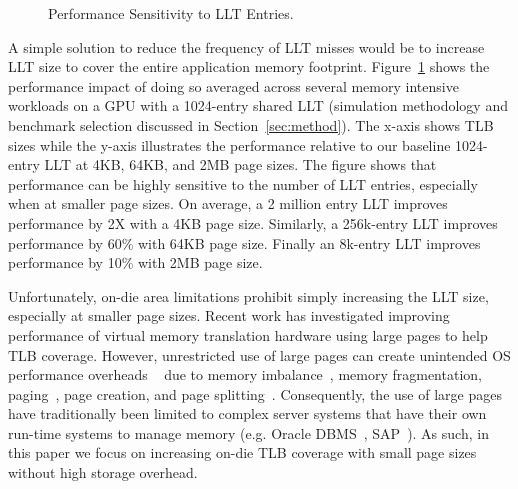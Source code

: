 \begin{figure}[t] 
\vspace{0. in}
\centering
\centerline{}

	\caption{\small Performance Sensitivity to LLT Entries. \normalsize}

\label{fig:tlb_sensitivity} 
\vspace{-0.15 in}
\end{figure}

A simple
solution to reduce the frequency of LLT misses would be to increase LLT size
to cover the entire application memory footprint. 
Figure~\ref{fig:tlb_sensitivity} shows the performance impact of doing so
averaged across several memory intensive workloads on a GPU with a 1024-entry
shared LLT (simulation methodology and benchmark selection discussed in 
Section~\ref{sec:method}). The
x-axis shows TLB sizes while the y-axis
illustrates the performance relative to our baseline 1024-entry LLT
at 4KB, 64KB, and 2MB page sizes. 
The figure shows that performance can be highly sensitive to the number of LLT entries, especially when
at smaller page sizes. On average, a 2 million entry LLT improves
performance by 2X with a 4KB page size. Similarly, a 256k-entry
LLT improves performance by 60\% with 64KB page size. Finally an 8k-entry LLT improves performance by 10\% with 2MB page size.

Unfortunately,
on-die area limitations prohibit simply increasing the LLT size, especially
at smaller page sizes. 
Recent work has investigated improving performance of virtual memory
translation hardware using large pages to help TLB coverage. 
However, unrestricted use of large pages can create unintended
OS performance overheads ~\cite{SuperPageProblem, TwoPageSize} due to
memory imbalance~\cite{numa-harmful}, memory fragmentation,
paging~\cite{cameo}, page creation, and page
splitting~\cite{largepagevm}. Consequently, the use of large pages
have traditionally been limited to complex server systems that have
their own run-time systems to manage memory (e.g. Oracle
DBMS~\cite{oracle_dbms}, SAP~\cite{sap}).
As such, in this paper we focus on increasing on-die TLB
coverage with small page sizes without high storage overhead.


